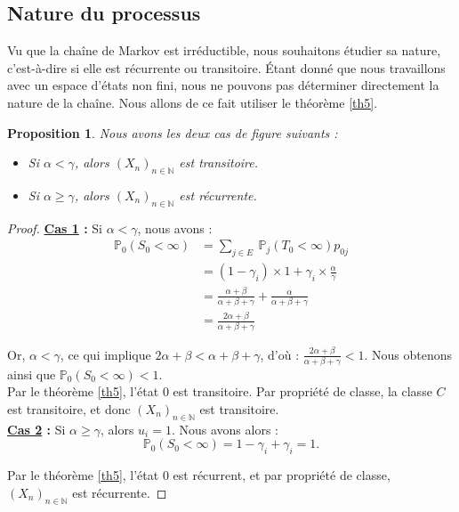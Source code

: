 \documentclass[12pt,a4paper]{report}
\newtheorem{prop}[thm]{Proposition}
\theoremstyle{remark}
\begin{document}
\subsection{Nature du processus}
\vspace{0.6cm}

Vu que la chaîne de Markov est irréductible, nous souhaitons étudier sa nature, c'est-à-dire si elle est récurrente ou transitoire. Étant donné que nous travaillons avec un espace d'états non fini, nous ne pouvons pas déterminer directement la nature de la chaîne. Nous allons de ce fait utiliser le théorème \ref{th5}.

\begin{prop}
Nous avons les deux cas de figure suivants :
\begin{itemize}
    \item Si $\alpha < \gamma$, alors $(X_n)_{n \in \mathbb{N}}$ est transitoire.
    \item Si $\alpha \geqslant \gamma$, alors $(X_n)_{n \in \mathbb{N}}$ est récurrente.
\end{itemize}
\end{prop}
\begin{proof}
\textbf{\underline{Cas 1} :} Si $\alpha<\gamma$, nous avons : 
\begin{align*}
\mathbb{P}_0(S_0 < \infty) &= \sum_{j\in E}{\ \mathbb{P}_j(T_0 < \infty)p_{0j}} \\
&= (1-\gamma_{i}) \times 1 + \gamma_{i} \times \frac{\alpha}{\gamma} \\
&=\frac{\alpha+\beta}{\alpha+\beta+\gamma}+\frac{\alpha}{\alpha+\beta+\gamma} \\
&= \frac{2\alpha+\beta}{\alpha+\beta+\gamma}
\end{align*}

Or, $\alpha < \gamma$, ce qui implique $2\alpha + \beta < \alpha + \beta + \gamma$, d'où : $\frac{2\alpha+\beta}{\alpha+\beta+\gamma} < 1$. Nous obtenons ainsi que $\mathbb{P}_0(S_0 < \infty) < 1$. \\
Par le théorème \ref{th5}, l'état $0$ est transitoire. Par propriété  de classe, la classe $C$ est transitoire, et donc $(X_n)_{n \in \mathbb{N}}$ est transitoire.\\

\textbf{\underline{Cas 2} :} Si $\alpha \geqslant \gamma$, alors $u_i=1$. Nous avons alors :
$$\mathbb{P}_0(S_0 < \infty)=
 1-\gamma_i+\gamma_i=1.$$

Par le théorème \ref{th5}, l'état $0$ est récurrent, et par propriété de classe, $(X_n)_{n \in \mathbb{N}}$ est récurrente.
\end{proof}
\end{document}
